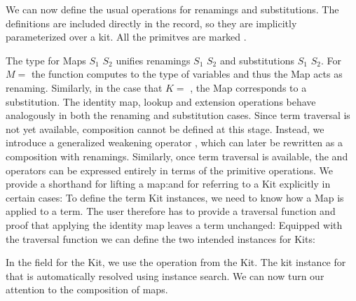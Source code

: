 \documentclass[screen,nonacm]{acmart}
\begin{document}
We can now define the usual operations for renamings and substitutions. The
definitions are included directly in the  record, so they are
implicitly parameterized over a kit. All the primitves are marked
.

\begin{minipage}[t]{0.48\linewidth}
      \raggedright{}
      \AMapA{}
\end{minipage}
\begin{minipage}[t]{0.48\linewidth}
      \raggedright{}
      \AMapB{}
\end{minipage}

\noindent The type for Maps $S_1$  $S_2$ unifies renamings $S_1$
 $S_2$ and substitutions $S_1$  $S_2$. For $M
      = $  the  function computes to
the type of variables and thus the Map acts as renaming. Similarly, in the case
that $K = $ , the Map corresponds to a
substitution. The identity map, lookup and extension operations behave
analogously in both the renaming and substitution cases. Since term traversal
is not yet available, composition cannot be defined at this stage. Instead, we
introduce a generalized weakening operator , which can
later be rewritten as a composition with renamings. Similarly, once term
traversal is available, the  and 
operators can be expressed entirely in terms of the primitive operations.
We provide a shorthand for lifting a map:\ALifting{}and for referring to a
Kit explicitly in certain cases: \AKitExplicit{}To define the term Kit instances,
we need to know how a Map is applied to a term. The
user therefore has to provide a traversal function and proof that
applying the identity map leaves a term unchanged: \ATraversal{}Equipped with the traversal function we can define the two intended instances
for Kits:

\begin{minipage}[t]{0.48\linewidth}
      \raggedright{}
      \AInstanceRen{}
\end{minipage}
\begin{minipage}[t]{0.48\linewidth}
      \raggedright{}
      \AInstanceSub{}
\end{minipage}

\noindent In the  field for the  Kit, we use the  operation from the
 Kit. The kit instance for that is automatically resolved using
instance search. We can now turn our attention to the composition of maps.
\end{document}
